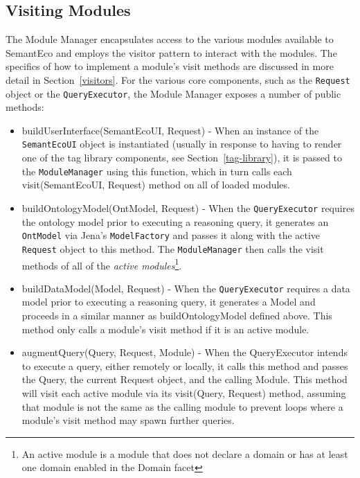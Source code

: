 \documentclass[letterpaper]{report}
\begin{document}
\subsection{Visiting Modules}
The Module Manager encapsulates access to the various modules available to SemantEco and employs the visitor pattern to interact with the modules. The specifics of how to implement a module's visit methods are discussed in more detail in Section~\ref{visitors}. For the various core components, such as the \texttt{Request} object or the \texttt{QueryExecutor}, the Module Manager exposes a number of public methods:

\begin{itemize}
\item buildUserInterface(SemantEcoUI, Request) - When an instance of the \texttt{SemantEcoUI} object is instantiated (usually in response to having to render one of the tag library components, see Section~\ref{tag-library}), it is passed to the \texttt{ModuleManager} using this function, which in turn calls each visit(SemantEcoUI, Request) method on all of loaded modules.
\item buildOntologyModel(OntModel, Request) - When the \texttt{QueryExecutor} requires the ontology model prior to executing a reasoning query, it generates an \texttt{OntModel} via Jena's \texttt{ModelFactory} and passes it along with the active \texttt{Request} object to this method. The \texttt{ModuleManager} then calls the visit methods of all of the \textit{active modules}\footnote{An active module is a module that does not declare a domain or has at least one domain enabled in the Domain facet}.
\item buildDataModel(Model, Request) - When the \texttt{QueryExecutor} requires a data model prior to executing a reasoning query, it generates a Model and proceeds in a similar manner as buildOntologyModel defined above. This method only calls a module's visit method if it is an active module.
\item augmentQuery(Query, Request, Module) - When the QueryExecutor intends to execute a query, either remotely or locally, it calls this method and passes the Query, the current Request object, and the calling Module. This method will visit each active module via its visit(Query, Request) method, assuming that module is not the same as the calling module to prevent loops where a module's visit method may spawn further queries.
\end{itemize}
\end{document}
